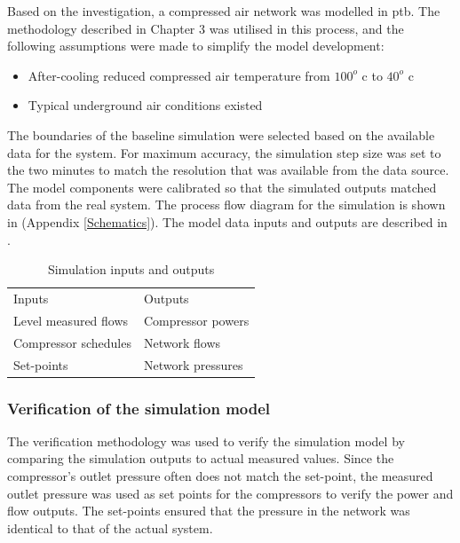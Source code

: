 Based on the investigation, a compressed air network was modelled in \gls{ptb}. The methodology described in Chapter 3 was utilised in this process, and the following assumptions were made to simplify the model development:
\begin{itemize}
	\item After-cooling reduced compressed air temperature from $ 100 ^o $ \gls{c} to $ 40 ^o $ \gls{c}
	\item Typical underground air conditions existed
\end{itemize}
 The boundaries of the baseline simulation were selected based on the available data for the system. For maximum accuracy, the simulation step size was set to the two minutes to match the resolution that was available from the data source.
The model components were calibrated so that the simulated outputs matched data from the real system. The process flow diagram for the simulation is shown in  (Appendix \ref{Schematics}). The model data inputs and outputs are described in .
\\
\begin{table}[h!]
	\caption{Simulation inputs and outputs}
	\centering
	\begin{tabular}{ll}
		\hline 
		Inputs \hspace*{4cm} & Outputs \hspace*{4cm} \\ \hhline{==}
		Level measured flows & Compressor powers \\
		Compressor schedules & Network flows \\
		Set-points & Network pressures \\
		\hline
	\end{tabular}
		
\label{table: Mine B inputs/outputs}
\end{table}
	
	\subsubsection{Verification of the simulation model}
	The verification methodology was used to verify the simulation model by comparing the simulation outputs to actual measured values. Since the compressor's outlet pressure often does not match the  set-point, the measured outlet pressure was used as set points for the compressors to verify the power and flow outputs. The  set-points ensured that the pressure in the network was identical to that of the actual system.
	\par 

